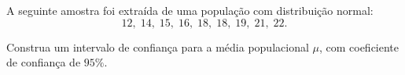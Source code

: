 %
%


\begin{exercicioBanco}[\valorquestao]
    A seguinte amostra foi extraída de uma população com distribuição normal:
\[
12,\;14,\;15,\;16,\;18,\;18,\;19,\;21,\;22.
\]

Construa um intervalo de confiança para a média populacional \(\mu\), com coeficiente de confiança de \(95\%\).
\end{exercicioBanco}

